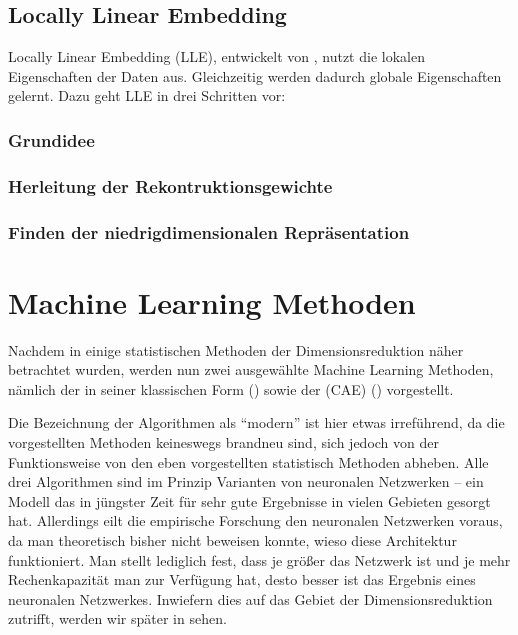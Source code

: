 \subsection{Locally Linear Embedding}
\label{ch:MethodenDerDimRed:statistisch:LLE}
Locally Linear Embedding (LLE), entwickelt von \textcite{Roweis.2000}, nutzt die lokalen Eigenschaften der Daten aus. Gleichzeitig werden dadurch globale Eigenschaften gelernt. Dazu geht LLE in drei Schritten vor:

\subsubsection{Grundidee}
\label{ch:MethodenDerDimRed:statistisch:LLE:Grundidee}
\subsubsection{Herleitung der Rekontruktionsgewichte}

\subsubsection{Finden der niedrigdimensionalen Repräsentation}

\newpage

\section{Machine Learning Methoden}
\label{ch:MethodenDerDimRed:modern}
Nachdem in  einige statistischen Methoden der
Dimensionsreduktion näher betrachtet wurden, werden nun zwei ausgewählte Machine Learning Methoden,
nämlich der  in seiner klassischen Form
() sowie der  (CAE)
() vorgestellt.

Die Bezeichnung der Algorithmen als \enquote{modern} ist hier etwas irreführend, da die
vorgestellten Methoden keineswegs brandneu sind, sich jedoch von der Funktionsweise von den eben vorgestellten statistisch Methoden
abheben. Alle drei Algorithmen sind im Prinzip Varianten von neuronalen Netzwerken -- ein Modell
das in jüngster Zeit für sehr gute Ergebnisse in vielen Gebieten gesorgt hat. Allerdings eilt die
empirische Forschung den neuronalen Netzwerken voraus, da man theoretisch bisher nicht beweisen
konnte, wieso diese Architektur funktioniert. Man stellt lediglich fest, dass je größer das
Netzwerk ist und je mehr Rechenkapazität man zur Verfügung hat, desto besser ist das Ergebnis eines
neuronalen Netzwerkes\addref. Inwiefern dies auf das Gebiet der Dimensionsreduktion zutrifft,
werden wir später in  sehen.

